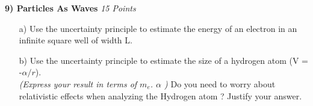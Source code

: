 {\textbf{9) Particles As Waves } \hfill \textit{15 Points}
\begin{itemize}
\item[a)] Use the uncertainty principle to estimate the energy of an electron in an infinite square well of width L.
\vspace*{2.5in}
\item[b)] Use the uncertainty principle to estimate the size of a hydrogen atom (V = -$\alpha/r$). \\ \textit{(Express your result in terms of $m_e$. $\alpha$ )}
          Do you need to worry about relativistic effects when analyzing the Hydrogen atom ?  Justify your answer.
\end{itemize}



} %

